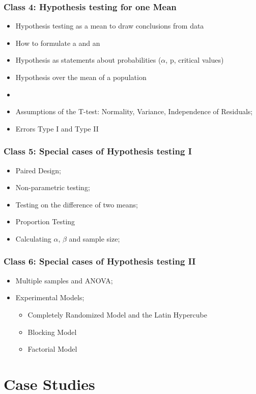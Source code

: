 \documentclass[10pt]{beamer}
\begin{document}
\begin{frame}
  \frametitle{Class 4: Hypothesis testing for one Mean}
  \begin{itemize}
  \item Hypothesis testing as a mean to draw conclusions from data
  \item How to formulate a  and an 
  \item Hypothesis as statements about probabilities ($\alpha$, p, critical values)
  \item Hypothesis over the mean of a population
  \item {}
  \item Assumptions of the T-test: Normality, Variance, Independence of Residuals;
  \item Errors Type I and Type II
  \end{itemize}
\end{frame}

\begin{frame}
  \frametitle{Class 5: Special cases of Hypothesis testing I}
  \begin{itemize}
  \item Paired Design;
  \item Non-parametric testing;
  \item Testing on the difference of two means;
  \item Proportion Testing
  \item Calculating $\alpha$, $\beta$ and sample size;    
  \end{itemize}
\end{frame}

\begin{frame}
  \frametitle{Class 6: Special cases of Hypothesis testing II}
  \begin{itemize}
  \item Multiple samples and ANOVA;
  \item Experimental Models;
    \begin{itemize}
      \item Completely Randomized Model and the Latin Hypercube
      \item Blocking Model
      \item Factorial Model
    \end{itemize}
  \end{itemize}
\end{frame}

\section{Case Studies}
\end{document}
